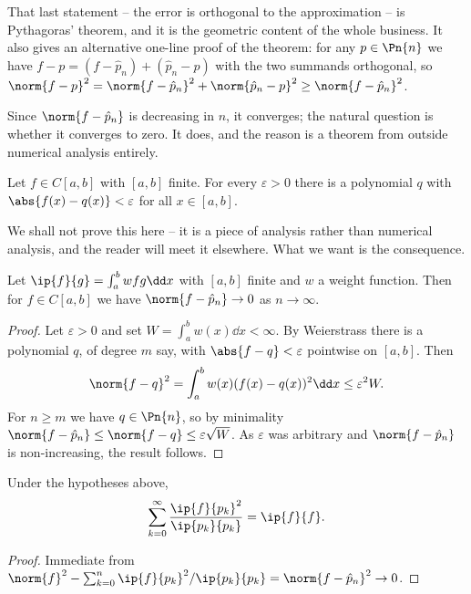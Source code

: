 That last statement -- the error is orthogonal to the approximation -- is Pythagoras' theorem, and it is the geometric content of the whole business. It also gives an alternative one-line proof of the theorem: for any $p \in \Pn{n}$ we have $f - p = (f - \hat p_n) + (\hat p_n - p)$ with the two summands orthogonal, so $\norm{f-p}^2 = \norm{f - \hat p_n}^2 + \norm{\hat p_n - p}^2 \geq \norm{f - \hat p_n}^2$.

Since $\norm{f - \hat p_n}$ is decreasing in $n$, it converges; the natural question is whether it converges to zero. It does, and the reason is a theorem from outside numerical analysis entirely.

\begin{theorem}
  Let $f \in C[a,b]$ with $[a,b]$ finite. For every $\varepsilon > 0$ there is a polynomial $q$ with $\abs{f(x) - q(x)} < \varepsilon$ for all $x \in [a,b]$.
\end{theorem}

We shall not prove this here -- it is a piece of analysis rather than numerical analysis, and the reader will meet it elsewhere. What we want is the consequence.

\begin{corollary}
  Let $\ip{f}{g} = \int_a^b w f g \dd x$ with $[a,b]$ finite and $w$ a weight function. Then for $f \in C[a,b]$ we have $\norm{f - \hat p_n} \to 0$ as $n \to \infty$.
\end{corollary}
\begin{proof}
  Let $\varepsilon > 0$ and set $W = \int_a^b w(x)\dd x < \infty$. By Weierstrass there is a polynomial $q$, of degree $m$ say, with $\abs{f - q} < \varepsilon$ pointwise on $[a,b]$. Then
  $$
  \norm{f - q}^2 = \int_a^b w(x)(f(x)-q(x))^2 \dd x \leq \varepsilon^2 W.
  $$
  For $n \geq m$ we have $q \in \Pn{n}$, so by minimality $\norm{f - \hat p_n} \leq \norm{f - q} \leq \varepsilon \sqrt{W}$. As $\varepsilon$ was arbitrary and $\norm{f - \hat p_n}$ is non-increasing, the result follows.
\end{proof}

\begin{corollary}
  Under the hypotheses above,
  $$
  \sum_{k=0}^\infty \frac{\ip{f}{p_k}^2}{\ip{p_k}{p_k}} = \ip{f}{f}.
  $$
\end{corollary}
\begin{proof}
  Immediate from $\norm{f}^2 - \sum_{k=0}^n \ip{f}{p_k}^2/\ip{p_k}{p_k} = \norm{f - \hat p_n}^2 \to 0$.
\end{proof}

